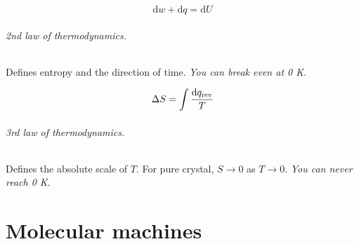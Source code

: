 \documentclass{article}
\numberwithin{theorem}{section}
\numberwithin{corollary}{section}
\numberwithin{postulate}{section}
\numberwithin{lemma}{section}
\numberwithin{definition}{section}
\begin{document}
\begin{equation}
  \mathrm{d}w + \mathrm{d}q = \mathrm{d}U
\end{equation}

\paragraph{2nd law of thermodynamics.} Defines entropy and the direction of
time. \textit{You can break even at 0 K}.

\begin{equation}
  \Delta S = \int \frac{\textnormal{d} q_{\mathrm{rev}}}{T}
\end{equation}

\paragraph{3rd law of thermodynamics.} Defines the absolute scale of $T$. For
pure crystal, $S \rightarrow 0$ as $T \rightarrow 0$. \textit{You can never
reach 0 K}.

\part{Molecular machines}
\end{document}
